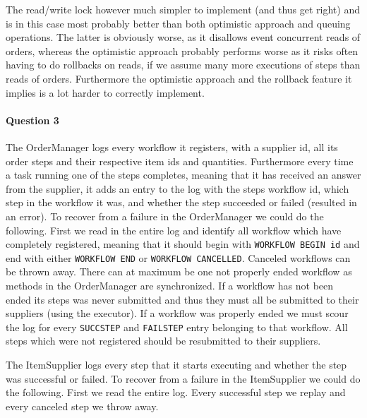 \documentclass[a4paper, 11pt]{article}
\begin{document}
The read/write lock however much simpler to implement (and thus get right) and is in this case most probably better than both optimistic approach and queuing operations. The latter is obviously worse, as it disallows event concurrent reads of orders, whereas the optimistic approach probably performs worse as it risks often having to do rollbacks on reads, if we assume many more executions of steps than reads of orders. Furthermore the optimistic approach and the rollback feature it implies is a lot harder to correctly implement.


\paragraph{Question 3} %
\label{par:question_3}
The OrderManager logs every workflow it registers, with a supplier id, all its order steps and their respective item ids and quantities. Furthermore every time a task running one of the steps completes, meaning that it has received an answer from the supplier, it adds an entry to the log with the steps workflow id, which step in the workflow it was, and whether the step succeeded or failed (resulted in an error). To recover from a failure in the OrderManager we could do the following. First we read in the entire log and identify all workflow which have completely registered, meaning that it should begin with \texttt{WORKFLOW BEGIN id} and end with either \texttt{WORKFLOW END} or \texttt{WORKFLOW CANCELLED}. Canceled workflows can be thrown away. There can at maximum be one not properly ended workflow as methods in the OrderManager are synchronized. If a workflow has not been ended its steps was never submitted and thus they must all be submitted to their suppliers (using the executor). If a workflow was properly ended we must scour the log for every \texttt{SUCCSTEP} and \texttt{FAILSTEP} entry belonging to that workflow. All steps which were not registered should be resubmitted to their suppliers.


The ItemSupplier logs every step that it starts executing and whether the step was successful or failed. To recover from a failure in the ItemSupplier we could do the following. First we read the entire log. Every successful step we replay and every canceled step we throw away.
\end{document}
